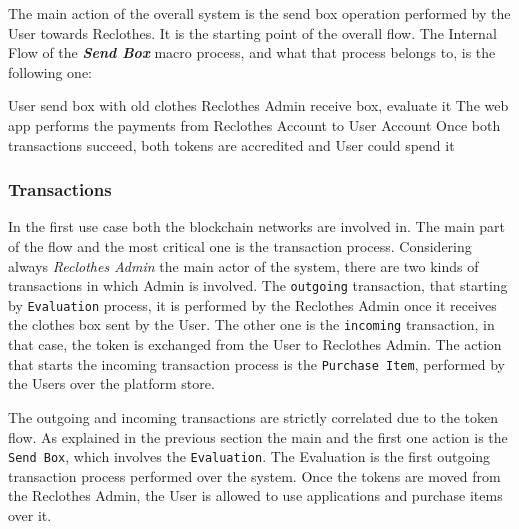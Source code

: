 The main action of the overall system is the send box operation performed by the User towards Reclothes.
It is the starting point of the overall flow. The Internal Flow of the \textit{\bf{Send Box}} macro 
process, and what that process belongs to, is the following one:

\begin{outline}[enumerate]
    \1 User send box with old clothes
    \1 Reclothes Admin receive box, evaluate it
    \1 The web app performs the payments from Reclothes Account to User Account
    \1 Once both transactions succeed, both tokens are accredited and User could spend it
\end{outline}

\subsubsection{Transactions}

In the first use case both the blockchain networks are involved in. The main part of the flow and the most critical one is the 
transaction process. Considering always \textit{Reclothes Admin} the main actor of the system, there are two kinds 
of transactions in which Admin is involved. 
The \texttt{outgoing} transaction, that starting by \texttt{Evaluation} process, it is performed by the Reclothes Admin once 
it receives the clothes box sent by the User. The other one is the \texttt{incoming} transaction, in that case, the 
token is exchanged from the User to Reclothes Admin. The action that starts the incoming transaction process is the 
\texttt{Purchase Item}, performed by the Users over the platform store.
\bigskip

The outgoing and incoming transactions are strictly correlated due to the token flow. As explained in the previous 
section the main and the first one action is the \texttt{Send Box}, which involves the \texttt{Evaluation}.
The Evaluation is the first outgoing transaction process performed over the system. Once the tokens are moved from the 
Reclothes Admin, the User is allowed to use applications and purchase items over it.

